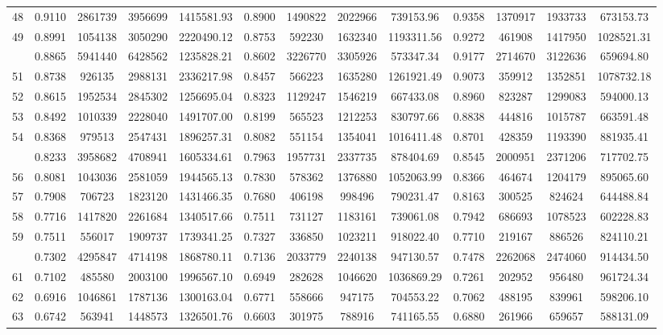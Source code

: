 \documentclass[
  12pt,
]{article}
\begin{document}
\begin{longtable}[t]{lcccccccccccc}
48 & 0.9110 & 2861739 & 3956699 & 1415581.93 & 0.8900 & 1490822 & 2022966 & 739153.96 & 0.9358 & 1370917 & 1933733 & 673153.73\\
49 & 0.8991 & 1054138 & 3050290 & 2220490.12 & 0.8753 & 592230 & 1632340 & 1193311.56 & 0.9272 & 461908 & 1417950 & 1028521.31\\
\addlinespace
50 & 0.8865 & 5941440 & 6428562 & 1235828.21 & 0.8602 & 3226770 & 3305926 & 573347.34 & 0.9177 & 2714670 & 3122636 & 659694.80\\
51 & 0.8738 & 926135 & 2988131 & 2336217.98 & 0.8457 & 566223 & 1635280 & 1261921.49 & 0.9073 & 359912 & 1352851 & 1078732.18\\
52 & 0.8615 & 1952534 & 2845302 & 1256695.04 & 0.8323 & 1129247 & 1546219 & 667433.08 & 0.8960 & 823287 & 1299083 & 594000.13\\
53 & 0.8492 & 1010339 & 2228040 & 1491707.00 & 0.8199 & 565523 & 1212253 & 830797.66 & 0.8838 & 444816 & 1015787 & 663591.48\\
54 & 0.8368 & 979513 & 2547431 & 1896257.31 & 0.8082 & 551154 & 1354041 & 1016411.48 & 0.8701 & 428359 & 1193390 & 881935.41\\
\addlinespace
55 & 0.8233 & 3958682 & 4708941 & 1605334.61 & 0.7963 & 1957731 & 2337735 & 878404.69 & 0.8545 & 2000951 & 2371206 & 717702.75\\
56 & 0.8081 & 1043036 & 2581059 & 1944565.13 & 0.7830 & 578362 & 1376880 & 1052063.99 & 0.8366 & 464674 & 1204179 & 895065.60\\
57 & 0.7908 & 706723 & 1823120 & 1431466.35 & 0.7680 & 406198 & 998496 & 790231.47 & 0.8163 & 300525 & 824624 & 644488.84\\
58 & 0.7716 & 1417820 & 2261684 & 1340517.66 & 0.7511 & 731127 & 1183161 & 739061.08 & 0.7942 & 686693 & 1078523 & 602228.83\\
59 & 0.7511 & 556017 & 1909737 & 1739341.25 & 0.7327 & 336850 & 1023211 & 918022.40 & 0.7710 & 219167 & 886526 & 824110.21\\
\addlinespace
60 & 0.7302 & 4295847 & 4714198 & 1868780.11 & 0.7136 & 2033779 & 2240138 & 947130.57 & 0.7478 & 2262068 & 2474060 & 914434.50\\
61 & 0.7102 & 485580 & 2003100 & 1996567.10 & 0.6949 & 282628 & 1046620 & 1036869.29 & 0.7261 & 202952 & 956480 & 961724.34\\
62 & 0.6916 & 1046861 & 1787136 & 1300163.04 & 0.6771 & 558666 & 947175 & 704553.22 & 0.7062 & 488195 & 839961 & 598206.10\\
63 & 0.6742 & 563941 & 1448573 & 1326501.76 & 0.6603 & 301975 & 788916 & 741165.55 & 0.6880 & 261966 & 659657 & 588131.09\\

\end{longtable}
\end{document}
